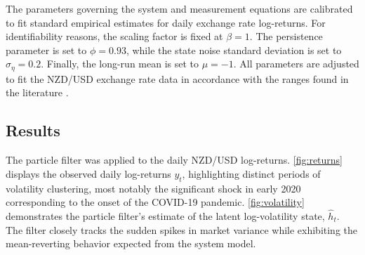 \documentclass[10pt, a4paper]{article}
\numberwithin{equation}{section}
\begin{document}
\begin{algorithm}[ht]
\caption{Stochastic Volatility Particle Filter}\label{alg:svpf}
\begin{algorithmic}[1]
\ttfamily
{}
\EndFor{}
    \EndFor{}
    \EndFor{}
    \EndIf{}
\EndFor{}
\end{algorithmic}
\end{algorithm}

The parameters governing the system and measurement equations are calibrated to fit standard empirical estimates for daily exchange rate log-returns. For identifiability reasons, the scaling factor is fixed at \(\beta = 1\). The persistence parameter is set to \(\phi = 0.93\), while the state noise standard deviation is set to \(\sigma_\eta = 0.2\). Finally, the long-run mean is set to \(\mu = -1\). All parameters are adjusted to fit the NZD/USD exchange rate data in accordance with the ranges found in the literature \parencite{Kim1998}.

\subsection{Results}

The particle filter was applied to the daily NZD/USD log-returns. \autoref{fig:returns} displays the observed daily log-returns \(y_t\), highlighting distinct periods of volatility clustering, most notably the significant shock in early 2020 corresponding to the onset of the COVID-19 pandemic. \autoref{fig:volatility} demonstrates the particle filter's estimate of the latent log-volatility state, \(\hat{h}_t\). The filter closely tracks the sudden spikes in market variance while exhibiting the mean-reverting behavior expected from the system model.
\end{document}

